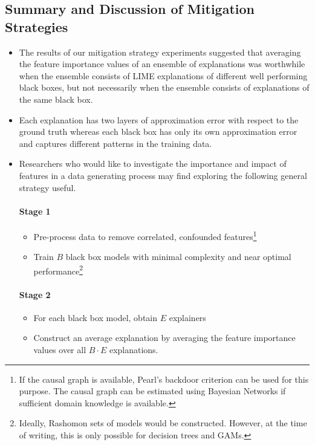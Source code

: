 \documentclass[mnsc,blindrev]{informs3}
\begin{document}
        \subsection{Summary and Discussion of Mitigation Strategies}
        \label{sec:summary_and_strategies}
            \begin{itemize}
            \item The results of our mitigation strategy experiments suggested that averaging the feature importance values of an ensemble of explanations was worthwhile when the ensemble consists of LIME explanations of different well performing black boxes, but not necessarily when the ensemble consists of explanations of the same black box. 
            
            \item Each explanation has two layers of approximation error with respect to the ground truth whereas each black box has only its own approximation error and captures different patterns in the training data. 
            
            \item Researchers who would like to investigate the importance and impact of features in a data generating process may find  exploring the following general strategy useful. 
            
            \paragraph{Stage 1}
                    \begin{itemize}
                        \item Pre-process data to remove correlated, confounded features\footnote{If the causal graph is available, Pearl's backdoor criterion can be used for this purpose. The causal graph can be estimated using Bayesian Networks if sufficient domain knowledge is available.}
                        \item Train $B$ black box models with minimal complexity and near optimal performance\footnote{Ideally, Rashomon sets of models would be constructed. However, at the time of writing, this is only possible for decision trees and GAMs.}
                    \end{itemize}
                
            \paragraph{Stage 2}
                \begin{itemize}
                    \item For each black box model, obtain $E$ explainers%
                    \item Construct an average explanation by averaging the feature importance values over all $B\cdot E$ explanations. %
                \end{itemize}

            \end{itemize}
    
\end{document}
